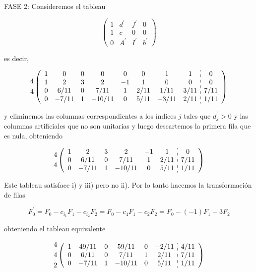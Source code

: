 \documentclass[10pt]{article}
\begin{document}
FASE 2: Consideremos el tableau

$$
\left(\begin{array}{ccc|c}
1 & d^{\prime} & f^{\prime} & 0 \\
1 & c & 0 & 0 \\
0 & A^{\prime} & I^{\prime} & b^{\prime}
\end{array}\right)
$$

es decir,

$$
\begin{aligned}
& 4 \\
& 4
\end{aligned}\left(\begin{array}{cccccccc:c}
1 & 0 & 0 & 0 & 0 & 0 & 1 & 1 & 0 \\
1 & 2 & 3 & 2 & -1 & 1 & 0 & 0 & 0 \\
0 & 6 / 11 & 0 & 7 / 11 & 1 & 2 / 11 & 1 / 11 & 3 / 11 & 7 / 11 \\
0 & -7 / 11 & 1 & -10 / 11 & 0 & 5 / 11 & -3 / 11 & 2 / 11 & 1 / 11
\end{array}\right)
$$

y eliminemos las columnas correspondientes a los índices $j$ tales que $d_{j}^{\prime}>0$ y las columnas artificiales que no son unitarias y luego descartemos la primera fila que es nula, obteniendo

$$
\begin{gathered}
4 \\
4
\end{gathered}\left(\begin{array}{cccccc:c}
1 & 2 & 3 & 2 & -1 & 1 & 0 \\
0 & 6 / 11 & 0 & 7 / 11 & 1 & 2 / 11 & 7 / 11 \\
0 & -7 / 11 & 1 & -10 / 11 & 0 & 5 / 11 & 1 / 11
\end{array}\right)
$$

Este tableau satisface i) y iii) pero no ii). Por lo tanto hacemos la transformación de filas

$$
F_{0}^{\prime}=F_{0}-c_{i_{1}} F_{1}-c_{i_{2}} F_{2}=F_{0}-c_{4} F_{1}-c_{2} F_{2}=F_{0}-(-1) F_{1}-3 F_{2}
$$

obteniendo el tableau equivalente

$$
\begin{aligned}
& 4 \\
& 4 \\
& 2
\end{aligned}\left(\begin{array}{cccccc:c}
1 & 49 / 11 & 0 & 59 / 11 & 0 & -2 / 11 & 4 / 11 \\
0 & 6 / 11 & 0 & 7 / 11 & 1 & 2 / 11 & 7 / 11 \\
0 & -7 / 11 & 1 & -10 / 11 & 0 & 5 / 11 & 1 / 11
\end{array}\right)
$$
\end{document}
